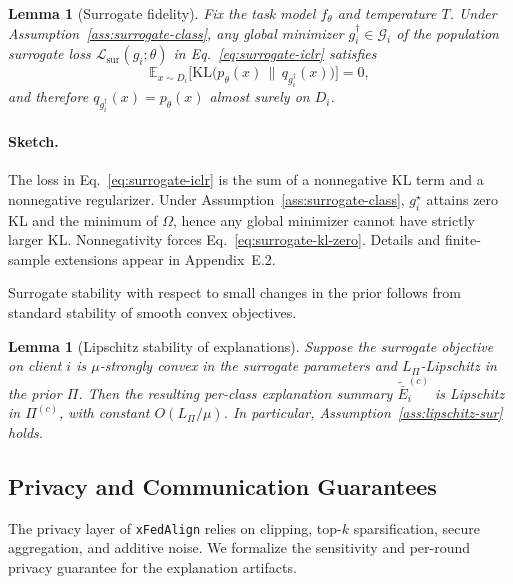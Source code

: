 \documentclass{article}
\theoremstyle{plain}
\newtheorem{lemma}[theorem]{Lemma}
\theoremstyle{definition}
\theoremstyle{remark}
\begin{document}
\begin{lemma}[Surrogate fidelity]
\label{lem:surrogate-fidelity}
Fix the task model $f_\theta$ and temperature $T$. Under
Assumption~\ref{ass:surrogate-class}, any global minimizer
$g_i^\dagger \in \mathcal{G}_i$ of the population surrogate loss
$\mathcal{L}_{\mathrm{sur}}(g_i;\theta)$ in Eq.~\eqref{eq:surrogate-iclr}
satisfies
\begin{equation}
\label{eq:surrogate-kl-zero}
\mathbb{E}_{x\sim D_i}\!\Big[
\mathrm{KL}\big(p_\theta(x)\,\|\,q_{g_i^\dagger}(x)\big)
\Big] = 0,
\end{equation}
and therefore $q_{g_i^\dagger}(x) = p_\theta(x)$ almost surely on $D_i$.
\end{lemma}

\paragraph{Sketch.}
The loss in Eq.~\eqref{eq:surrogate-iclr} is the sum of a nonnegative
KL term and a nonnegative regularizer. Under
Assumption~\ref{ass:surrogate-class}, $g_i^\star$ attains zero KL and the
minimum of $\Omega$, hence any global minimizer cannot have strictly larger
KL. Nonnegativity forces Eq.~\eqref{eq:surrogate-kl-zero}. Details and
finite-sample extensions appear in Appendix~E.2.

Surrogate stability with respect to small changes in the prior follows
from standard stability of smooth convex objectives.

\begin{lemma}[Lipschitz stability of explanations]
\label{lem:surrogate-stability}
Suppose the surrogate objective on client $i$ is $\mu$-strongly convex in the
surrogate parameters and $L_\Pi$-Lipschitz in the prior $\Pi$. Then the
resulting per-class explanation summary $\tilde{\bar{E}}^{(c)}_i$ is
Lipschitz in $\Pi^{(c)}$, with constant $O(L_\Pi/\mu)$. In particular,
Assumption~\ref{ass:lipschitz-sur} holds.
\end{lemma}

\subsection{Privacy and Communication Guarantees}

The privacy layer of \texttt{xFedAlign} relies on clipping, top-$k$
sparsification, secure aggregation, and additive noise. We formalize the
sensitivity and per-round privacy guarantee for the explanation artifacts.
\end{document}
